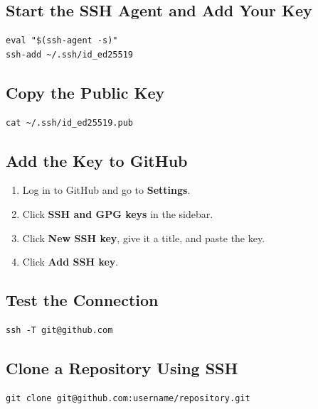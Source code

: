 \subsection{Start the SSH Agent and Add Your Key}
\begin{lstlisting}
eval "$(ssh-agent -s)"
ssh-add ~/.ssh/id_ed25519
\end{lstlisting}

\subsection{Copy the Public Key}
\begin{lstlisting}
cat ~/.ssh/id_ed25519.pub
\end{lstlisting}

\subsection{Add the Key to GitHub}
\begin{enumerate}[leftmargin=*]
    \item Log in to GitHub and go to \textbf{Settings}.
    \item Click \textbf{SSH and GPG keys} in the sidebar.
    \item Click \textbf{New SSH key}, give it a title, and paste the key.
    \item Click \textbf{Add SSH key}.
\end{enumerate}

\subsection{Test the Connection}
\begin{lstlisting}
ssh -T git@github.com
\end{lstlisting}

\subsection{Clone a Repository Using SSH}
\begin{lstlisting}
git clone git@github.com:username/repository.git
\end{lstlisting}


